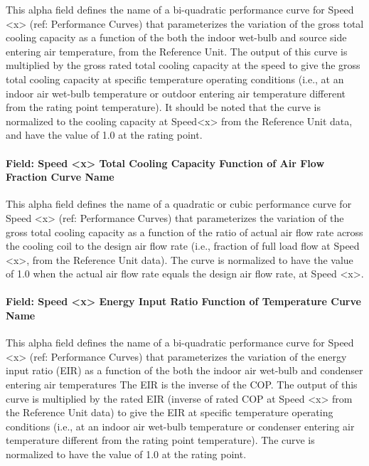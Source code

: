 This alpha field defines the name of a bi-quadratic performance curve for Speed \textless{}x\textgreater{} (ref: Performance Curves) that parameterizes the variation of the gross total cooling capacity as a function of the both the indoor wet-bulb and source side entering air temperature, from the Reference Unit. The output of this curve is multiplied by the gross rated total cooling capacity at the speed to give the gross total cooling capacity at specific temperature operating conditions (i.e., at an indoor air wet-bulb temperature or outdoor entering air temperature different from the rating point temperature). It should be noted that the curve is normalized to the cooling capacity at Speed\textless{}x\textgreater{} from the Reference Unit data, and have the value of 1.0 at the rating point.

\paragraph{Field: Speed \textless{}x\textgreater{} Total Cooling Capacity Function of Air Flow Fraction Curve Name}\label{field-speed-x-total-cooling-capacity-function-of-air-flow-fraction-curve-name}

This alpha field defines the name of a quadratic or cubic performance curve for Speed \textless{}x\textgreater{} (ref: Performance Curves) that parameterizes the variation of the gross total cooling capacity as a function of the ratio of actual air flow rate across the cooling coil to the design air flow rate (i.e., fraction of full load flow at Speed \textless{}x\textgreater{}, from the Reference Unit data). The curve is normalized to have the value of 1.0 when the actual air flow rate equals the design air flow rate, at Speed \textless{}x\textgreater{}.

\paragraph{Field: Speed \textless{}x\textgreater{} Energy Input Ratio Function of Temperature Curve Name}\label{field-speed-x-energy-input-ratio-function-of-temperature-curve-name-1}

This alpha field defines the name of a bi-quadratic performance curve for Speed \textless{}x\textgreater{} (ref: Performance Curves) that parameterizes the variation of the energy input ratio (EIR) as a function of the both the indoor air wet-bulb and condenser entering air temperatures The EIR is the inverse of the COP. The output of this curve is multiplied by the rated EIR (inverse of rated COP at Speed \textless{}x\textgreater{} from the Reference Unit data) to give the EIR at specific temperature operating conditions (i.e., at an indoor air wet-bulb temperature or condenser entering air temperature different from the rating point temperature). The curve is normalized to have the value of 1.0 at the rating point.

